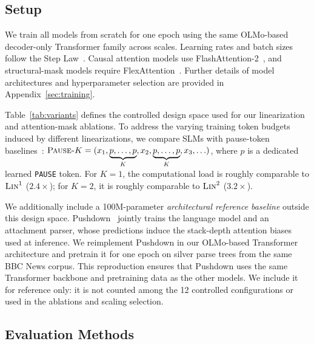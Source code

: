 \documentclass[11pt]{article}
\begin{document}
\subsection{Setup}

We train all models from scratch for one epoch using the same OLMo-based~\cite{groeneveld-etal-2024-olmo} decoder-only Transformer family across scales. Learning rates and batch sizes follow the Step Law~\cite{li2025predictable}. Causal attention models use FlashAttention-2~\cite{dao2023flashattention2}, and structural-mask models require FlexAttention~\cite{dong2024flex}. Further details of model architectures and hyperparameter selection are provided in Appendix~\ref{sec:training}.

Table~\ref{tab:variants} defines the controlled design space used for our linearization and attention-mask ablations. To address the varying training token budgets induced by different linearizations, we compare SLMs with pause-token baselines~\cite{goyal2024think}: $\textsc{Pause-}K = (x_1, \underbrace{p, \ldots, p}_{K}, x_2, \underbrace{p, \ldots, p}_{K}, x_3, \ldots)$, where $p$ is a dedicated learned \texttt{PAUSE} token. For $K=1$, the computational load is roughly comparable to $\textsc{Lin}^1$ ($2.4\times$); for $K=2$, it is roughly comparable to $\textsc{Lin}^2$ ($3.2\times$).

We additionally include a 100M-parameter \emph{architectural reference baseline} outside this design space. Pushdown~\cite{murty-etal-2023-pushdown} jointly trains the language model and an attachment parser, whose predictions induce the stack-depth attention biases used at inference. We reimplement Pushdown in our OLMo-based Transformer architecture and pretrain it for one epoch on silver parse trees from the same BBC News corpus. This reproduction ensures that Pushdown uses the same Transformer backbone and pretraining data as the other models. We include it for reference only: it is not counted among the 12 controlled configurations or used in the ablations and scaling selection.

\subsection{Evaluation Methods}
\end{document}
